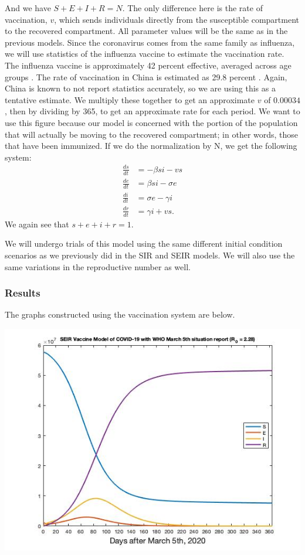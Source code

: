 \documentclass[12pt, a4paper]{article}
\begin{document}
        And we have $S + E + I + R = N$. The only difference here is the rate of vaccination, $v$, which sends individuals directly from the susceptible compartment to the recovered compartment. All parameter values will be the same as in the previous models. Since the coronavirus comes from the same family as influenza, we will use statistics of the influenza vaccine to estimate the vaccination rate. The influenza vaccine is approximately 42 percent effective, averaged across age groups \cite{flu}. The rate of vaccination in China is estimated as 29.8 percent \cite{rate}. Again, China is known to not report statistics accurately, so we are using this as a tentative estimate. We multiply these together to get an approximate $v$ of $0.00034$, then by dividing by 365, to get an approximate rate for each period. We want to use this figure because our model is concerned with the portion of the population that will actually be moving to the recovered compartment; in other words, those that have been immunized. If we do the normalization by N, we get the following system:
        \begin{align*}
            \frac{ds}{dt} &= -\beta si - vs \\
            \frac{de}{dt} &= \beta si - \sigma e \\
            \frac{di}{dt} &= \sigma e - \gamma i \\
            \frac{dr}{dt} &= \gamma i + vs.
        \end{align*}
        We again see that $s + e + i + r = 1$. 
        
        We will undergo trials of this model using the same different initial condition scenarios as we previously did in the SIR and SEIR models. We will also use the same variations in the reproductive number as well.
        
        \subsubsection{Results}
        
        The graphs constructed using the vaccination system are below.
        
        \includegraphics[scale=0.75]{plots/whoseirv228.jpg}
        
\end{document}
